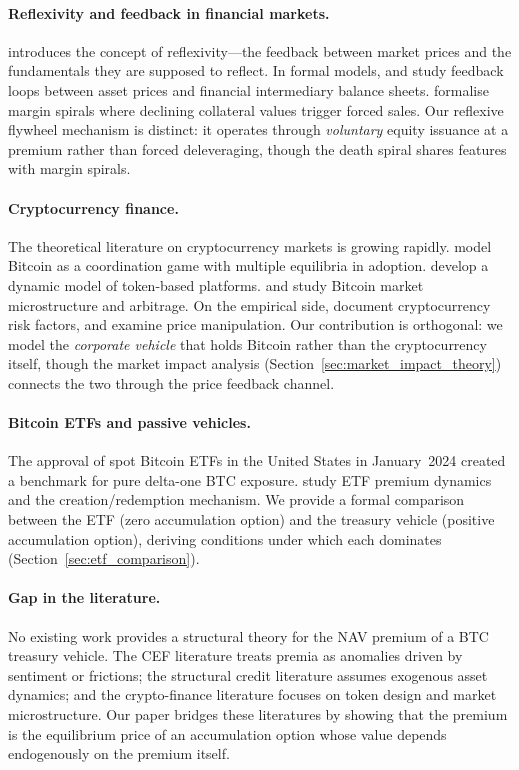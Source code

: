 \paragraph{Reflexivity and feedback in financial markets.}
\citet{soros1987alchemy} introduces the concept of reflexivity---the
feedback between market prices and the fundamentals they are supposed to
reflect.  In formal models, \citet{brunnermeier2014macroeconomic} and
\citet{he2013intermediary} study feedback loops between asset prices and
financial intermediary balance sheets.  \citet{brunnermeier2009market}
formalise margin spirals where declining collateral values trigger forced
sales.  Our reflexive flywheel mechanism is distinct: it operates through
\emph{voluntary} equity issuance at a premium rather than forced
deleveraging, though the death spiral shares features with margin spirals.

\paragraph{Cryptocurrency finance.}
The theoretical literature on cryptocurrency markets is growing rapidly.
\citet{biais2023equilibrium} model Bitcoin as a coordination game with
multiple equilibria in adoption.  \citet{cong2021tokenomics} develop a
dynamic model of token-based platforms.  \citet{foley2019sex} and
\citet{makarov2020trading} study Bitcoin market microstructure and
arbitrage.  On the empirical side, \citet{liu2021risks} document
cryptocurrency risk factors, and \citet{griffin2020bitcoin} examine price
manipulation.  Our contribution is orthogonal: we model the \emph{corporate
vehicle} that holds Bitcoin rather than the cryptocurrency itself, though
the market impact analysis (Section~\ref{sec:market_impact_theory}) connects
the two through the price feedback channel.

\paragraph{Bitcoin ETFs and passive vehicles.}
The approval of spot Bitcoin ETFs in the United States in January~2024
created a benchmark for pure delta-one BTC exposure.
\citet{alexander2024bitcoin} study ETF premium dynamics and the
creation/redemption mechanism.  We provide a formal comparison between the
ETF (zero accumulation option) and the treasury vehicle (positive
accumulation option), deriving conditions under which each dominates
(Section~\ref{sec:etf_comparison}).

\paragraph{Gap in the literature.}
No existing work provides a structural theory for the NAV premium of a BTC
treasury vehicle.  The CEF literature treats premia as anomalies driven by
sentiment or frictions; the structural credit literature assumes exogenous
asset dynamics; and the crypto-finance literature focuses on token design
and market microstructure.  Our paper bridges these literatures by showing
that the premium is the equilibrium price of an accumulation option whose
value depends endogenously on the premium itself.
